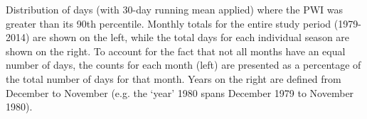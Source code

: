 \label{fig:annual_distribution}
Distribution of days (with 30-day running mean applied) where the PWI was greater than its 90th percentile. Monthly totals for the entire study period (1979-2014) are shown on the left, while the total days for each individual season are shown on the right. To account for the fact that not all months have an equal number of days, the counts for each month (left) are presented as a percentage of the total number of days for that month. Years on the right are defined from December to November (e.g. the `year' 1980 spans December 1979 to November 1980). 
